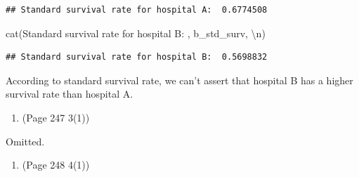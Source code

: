 \documentclass{article}
\newenvironment{Shaded}{\begin{snugshade}}{\end{snugshade}}
\newcommand{\FunctionTok}[1]{\textcolor[rgb]{0.00,0.00,0.00}{#1}}
\newcommand{\NormalTok}[1]{#1}
\newcommand{\SpecialCharTok}[1]{\textcolor[rgb]{0.00,0.00,0.00}{#1}}
\newcommand{\StringTok}[1]{\textcolor[rgb]{0.31,0.60,0.02}{#1}}
\begin{document}
\begin{verbatim}
## Standard survival rate for hospital A:  0.6774508
\end{verbatim}

\begin{Shaded}
\begin{Highlighting}[]
\FunctionTok{cat}\NormalTok{(}\StringTok{\textquotesingle{}Standard survival rate for hospital B: \textquotesingle{}}\NormalTok{, b\_std\_surv, }\StringTok{\textquotesingle{}}\SpecialCharTok{\textbackslash{}n}\StringTok{\textquotesingle{}}\NormalTok{)}
\end{Highlighting}
\end{Shaded}

\begin{verbatim}
## Standard survival rate for hospital B:  0.5698832
\end{verbatim}

According to standard survival rate, we can't assert that hospital B has
a higher survival rate than hospital A.

\begin{enumerate}
\def\labelenumi{\arabic{enumi}.}
\setcounter{enumi}{2}
\tightlist
\item
  (Page 247 3(1))
\end{enumerate}

Omitted.

\begin{enumerate}
\def\labelenumi{\arabic{enumi}.}
\setcounter{enumi}{3}
\tightlist
\item
  (Page 248 4(1))
\end{enumerate}
\end{document}
